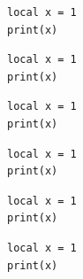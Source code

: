 \begin{verbatim}
local x = 1
print(x)
\end{verbatim}
\begin{verbatim}
local x = 1
print(x)
\end{verbatim}
\begin{verbatim}
local x = 1
print(x)
\end{verbatim}
\begin{frame}[t,fragile]
\begin{verbatim}
local x = 1
print(x)
\end{verbatim}
\end{frame}

\begin{frame}[t,fragile]
\begin{verbatim}
local x = 1
print(x)
\end{verbatim}
\end{frame}

\begin{frame}[t,fragile]
\begin{verbatim}
local x = 1
print(x)
\end{verbatim}
\end{frame}

